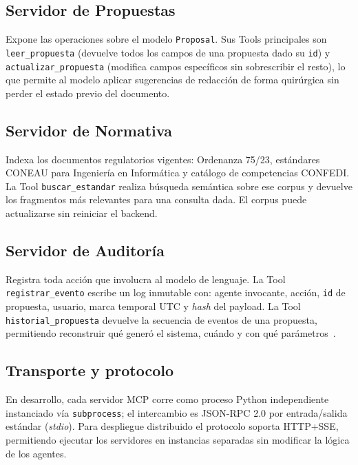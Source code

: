 \subsection{Servidor de Propuestas}
\label{subsec:mcp_propuestas}

Expone las operaciones sobre el modelo \texttt{Proposal}.
Sus Tools principales son \texttt{leer\_propuesta} (devuelve todos los campos
de una propuesta dado su \texttt{id}) y \texttt{actualizar\_propuesta}
(modifica campos específicos sin sobrescribir el resto), lo que permite al
modelo aplicar sugerencias de redacción de forma quirúrgica sin perder
el estado previo del documento.

\subsection{Servidor de Normativa}
\label{subsec:mcp_normativa}

Indexa los documentos regulatorios vigentes: Ordenanza 75/23, estándares
CONEAU para Ingeniería en Informática y catálogo de competencias CONFEDI.
La Tool \texttt{buscar\_estandar} realiza búsqueda semántica sobre ese corpus
y devuelve los fragmentos más relevantes para una consulta dada.
El corpus puede actualizarse sin reiniciar el backend.

\subsection{Servidor de Auditoría}
\label{subsec:mcp_auditoria}

Registra toda acción que involucra al modelo de lenguaje.
La Tool \texttt{registrar\_evento} escribe un log inmutable con: agente
invocante, acción, \texttt{id} de propuesta, usuario, marca temporal UTC y
\emph{hash} del payload.
La Tool \texttt{historial\_propuesta} devuelve la secuencia de eventos de una
propuesta, permitiendo reconstruir qué generó el sistema, cuándo y con qué
parámetros~\cite{iso_iec_42001_2023}.

\subsection{Transporte y protocolo}
\label{subsec:mcp_transporte}

En desarrollo, cada servidor MCP corre como proceso Python independiente
instanciado vía \texttt{subprocess}; el intercambio es JSON-RPC 2.0 por
entrada/salida estándar (\emph{stdio}).
Para despliegue distribuido el protocolo soporta HTTP+SSE, permitiendo
ejecutar los servidores en instancias separadas sin modificar la lógica
de los agentes.



